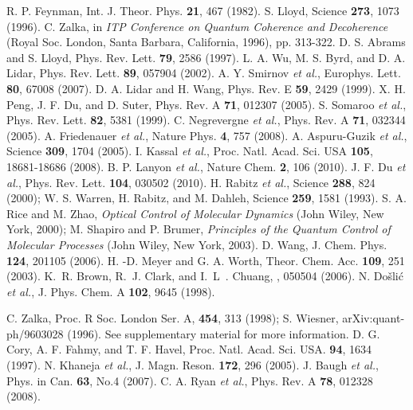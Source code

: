 \documentclass[prl,twocolumn,showpacs]{revtex4}
\begin{document}
\begin{thebibliography}{99}
 R. P. Feynman, Int. J. Theor. Phys. \textbf{21}, 467 (1982).
 S. Lloyd, Science \textbf{273}, 1073 (1996).
 C. Zalka, in {\it ITP Conference on Quantum Coherence and
Decoherence} (Royal Soc. London, Santa Barbara, California, 1996), pp. 313-322.
 D. S. Abrams and S. Lloyd, Phys. Rev. Lett. \textbf{79}, 2586
(1997).
 L. A. Wu, M. S. Byrd, and D. A. Lidar, Phys. Rev. Lett. \textbf{89},
057904 (2002).
 A. Y. Smirnov \emph{et al.},
Europhys. Lett. \textbf{80}, 67008 (2007).
 D. A. Lidar and H. Wang, Phys. Rev. E \textbf{59}, 2429 (1999).
 X. H. Peng, J. F. Du, and D. Suter, Phys. Rev. A \textbf{71},
012307 (2005).
 S. Somaroo \emph{et al.}, Phys. Rev. Lett. \textbf{82}, 5381 (1999).
 C. Negrevergne \emph{et al.}, Phys. Rev. A \textbf{71}, 032344 (2005).
 A. Friedenauer \emph{et al.}, Nature Phys. \textbf{4}, 757 (2008).
 A. Aspuru-Guzik \emph{et al.}, Science \textbf{309}, 1704 (2005).
 I. Kassal \emph{et al.}, Proc. Natl. Acad. Sci. USA \textbf{105}, 18681-18686 (2008).
 B. P. Lanyon \emph{et al.}, Nature Chem. \textbf{2}, 106 (2010).
 J. F. Du \emph{et al.}, Phys. Rev. Lett. \textbf{104}, 030502 (2010).
 H. Rabitz \emph{et al.}, Science \textbf{288}, 824 (2000);
W. S. Warren, H. Rabitz, and M. Dahleh, Science \textbf{ 259}, 1581 (1993).
 S. A. Rice and M. Zhao, {\it Optical Control of Molecular Dynamics}
(John Wiley, New York, 2000); M. Shapiro and P. Brumer, {\it Principles of the Quantum
Control of Molecular Processes} (John Wiley, New York, 2003).
 D. Wang, J. Chem. Phys. \textbf{124}, 201105 (2006).
 H. -D. Meyer and G. A. Worth,
Theor. Chem. Acc. \textbf{109}, 251 (2003).
K.~R. Brown, R.~J. Clark, and I.~L~. Chuang, , 050504 (2006).
N. {Do\v{s}li\'{c}} \emph{et al.}, J. Phys. Chem. A \textbf{102}, 9645 (1998).

 C. Zalka, Proc. R Soc. London Ser. A, \textbf{454}, 313 (1998); S. Wiesner, arXiv:quant-ph/9603028 (1996).
  See supplementary material for more information.
 D. G. Cory, A. F. Fahmy, and T. F. Havel, Proc. Natl. Acad. Sci. USA. \textbf{94}, 1634 (1997).
 N. Khaneja \emph{et al.}, J. Magn. Reson. \textbf{172}, 296 (2005).
 J. Baugh \emph{et al.}, Phys. in Can. \textbf{63}, No.4
(2007).
 C. A. Ryan \emph{et al.}, Phys. Rev. A \textbf{78}, 012328 (2008).
\end{thebibliography}
\end{document}
